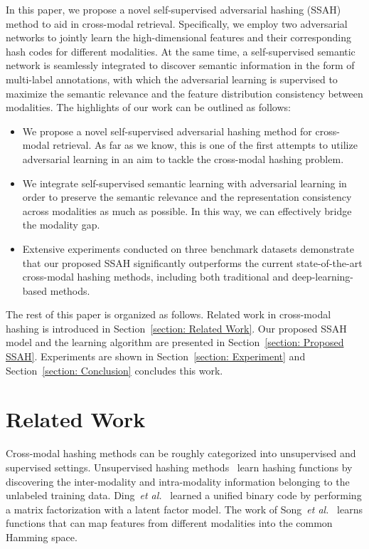 \documentclass[10pt,twocolumn,letterpaper]{article}
\begin{document}
In this paper, we propose a novel self-supervised adversarial hashing (SSAH) method to aid in cross-modal retrieval. Specifically, we employ two adversarial networks to jointly learn the high-dimensional features and their corresponding hash codes for different modalities. At the same time, a self-supervised semantic network is seamlessly integrated to discover semantic information in the form of multi-label annotations, with which the adversarial learning is supervised to maximize the semantic relevance and the feature distribution consistency between modalities. The highlights of our work can be outlined as follows:
\begin{itemize}
	\vspace{-0.1cm}
	\item We propose a novel self-supervised adversarial hashing method for cross-modal retrieval. As far as we know, this is one of the first attempts to utilize adversarial learning in an aim to tackle the cross-modal hashing problem.
	\vspace{-0.15cm}
	\item We integrate self-supervised semantic learning with adversarial learning in order to preserve the semantic relevance and the representation consistency across modalities as much as possible. In this way, we can effectively bridge the modality gap.
	\vspace{-0.15cm}
	\item Extensive experiments conducted on three benchmark datasets demonstrate that our proposed SSAH significantly outperforms the  current state-of-the-art cross-modal hashing methods, including both traditional and deep-learning-based methods.
	\vspace{-0.05cm}
\end{itemize}

The rest of this paper is organized as follows. Related work in cross-modal hashing is introduced in Section~\ref{section: Related Work}. Our proposed SSAH model and the learning algorithm are presented in Section~\ref{section: Proposed SSAH}. Experiments are shown in Section~\ref{section: Experiment} and Section~\ref{section: Conclusion} concludes this work.

\vspace{-0.25cm}
\section{Related Work}
\vspace{-0.15cm}
\label{section: Related Work}
Cross-modal hashing methods can be roughly categorized into unsupervised and supervised settings. Unsupervised hashing methods~\cite{Ding2014CVPR, Song2013Inter, Wang2015Semantic, zhou2014latent} learn hashing functions by discovering the inter-modality and intra-modality information belonging to the unlabeled training data. Ding~\emph{et al.}~\cite{Ding2014CVPR} learned a unified binary code by performing a matrix factorization with a latent factor model. The work of Song~\emph{et al.}~\cite{Song2013Inter} learns functions that can map features from different modalities into the common Hamming space.
\end{document}
